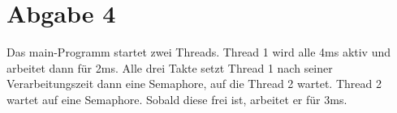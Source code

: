 \documentclass[12pt,a4paper,bibliography=totocnumbered]{scrartcl}
\begin{document}

\pagestyle{fancy}
\renewcommand{\sectionmark}[1]{\markright{\arabic{section}.\ #1}}
\renewcommand{\leftmark}{}
\fancyhf{}
\lhead{}
\chead{}
\rhead{\thesection\space\contentsname}
\cfoot{}
\rfoot{\ \linebreak  \thepage}
\renewcommand{\headrulewidth}{0.4pt}
\renewcommand{\footrulewidth}{0.4pt}




\clearpage

\setcounter{page}{1}

\fancyhead[LE,RO]{\rightmark}
\fancyfoot[LE,RO]{\thepage}


\section*{Abgabe 4}

Das main-Programm startet zwei Threads.
Thread 1 wird alle 4ms aktiv und arbeitet dann für 2ms. Alle drei Takte setzt Thread 1 nach seiner Verarbeitungszeit dann eine Semaphore, auf die Thread 2 wartet.
Thread 2 wartet auf eine Semaphore. Sobald diese frei ist, arbeitet er für 3ms.
\end{document}
